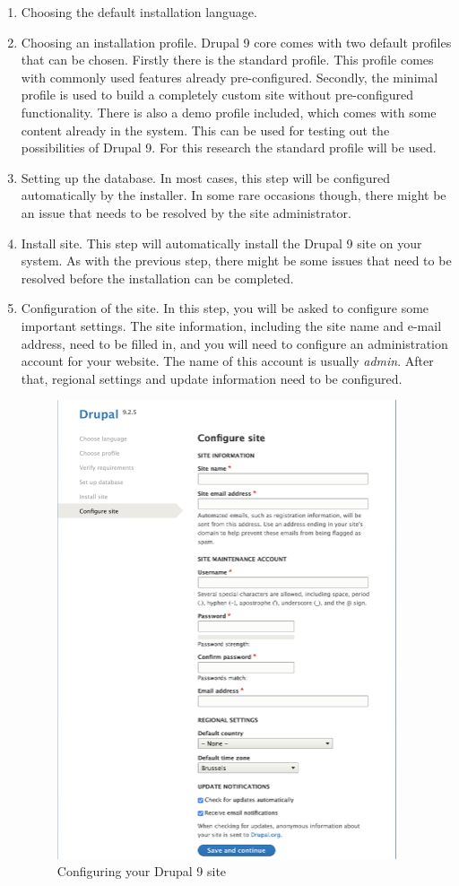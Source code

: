 \begin{enumerate}
	\item Choosing the default installation language.
	\item Choosing an installation profile. Drupal 9 core comes with two default profiles that can be chosen. Firstly there is the standard profile. This profile comes with commonly used features already pre-configured. Secondly, the minimal profile is used to build a completely custom site without pre-configured functionality. There is also a demo profile included, which comes with some content already in the system. This can be used for testing out the possibilities of Drupal 9. For this research the standard profile will be used.
	\item Setting up the database. In most cases, this step will be configured automatically by the installer. In some rare occasions though, there might be an issue that needs to be resolved by the site administrator.
	\item Install site. This step will automatically install the Drupal 9 site on your system. As with the previous step, there might be some issues that need to be resolved before the installation can be completed.
	\item Configuration of the site. In this step, you will be asked to configure some important settings. The site information, including the site name and e-mail address, need to be filled in, and you will need to configure an administration account for your website. The name of this account is usually \emph{admin}. After that, regional settings and update information need to be configured.
	\begin{figure}
		\centering
		\includegraphics[width=10cm]{./img/Install_Config.png}
		\caption[Configuring Drupal 9]{Configuring your Drupal 9 site}
	\end{figure}
\end{enumerate}

